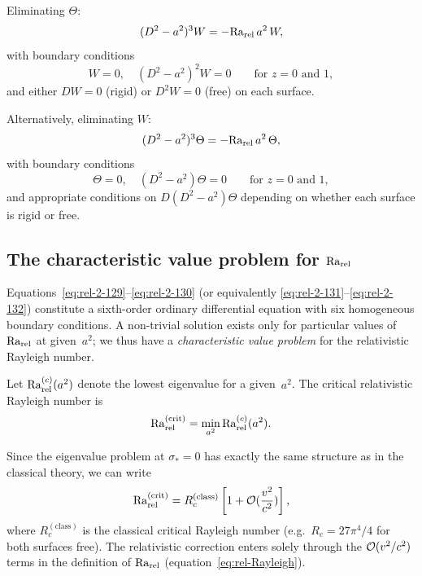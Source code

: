Eliminating $\Theta$:
\begin{equation}
\label{eq:rel-2-129}
(D^2 - a^2)^3 W = -\mathrm{Ra}_{\mathrm{rel}}\, a^2\, W,
\end{equation}
with boundary conditions
\begin{equation}
\label{eq:rel-2-130}
W = 0, \quad (D^2-a^2)^2 W = 0 \qquad\text{for } z = 0 \text{ and } 1,
\end{equation}
and either $DW = 0$ (rigid) or $D^2 W = 0$ (free) on each surface.

Alternatively, eliminating $W$:
\begin{equation}
\label{eq:rel-2-131}
(D^2-a^2)^3\Theta = -\mathrm{Ra}_{\mathrm{rel}}\, a^2\, \Theta,
\end{equation}
with boundary conditions
\begin{equation}
\label{eq:rel-2-132}
\Theta = 0, \quad (D^2-a^2)\Theta = 0 \qquad\text{for } z = 0 \text{ and } 1,
\end{equation}
and appropriate conditions on $D(D^2-a^2)\Theta$ depending on whether
each surface is rigid or free.

\subsection{The characteristic value problem for $\mathrm{Ra}_{\mathrm{rel}}$}
\label{sec:rel-12b}

Equations~\eqref{eq:rel-2-129}--\eqref{eq:rel-2-130} (or equivalently
\eqref{eq:rel-2-131}--\eqref{eq:rel-2-132}) constitute a sixth-order
ordinary differential equation with six homogeneous boundary conditions.
A non-trivial solution exists only for particular values of $\mathrm{Ra}_{\mathrm{rel}}$ at
given~$a^2$; we thus have a \emph{characteristic value problem} for the
relativistic Rayleigh number.

Let $\mathrm{Ra}_{\mathrm{rel}}^{(c)}(a^2)$ denote the lowest eigenvalue for a given~$a^2$.
The critical relativistic Rayleigh number is
\begin{equation}
\label{eq:rel-Rac}
\mathrm{Ra}_{\mathrm{rel}}^{(\mathrm{crit})}
= \min_{a^2} \mathrm{Ra}_{\mathrm{rel}}^{(c)}(a^2).
\end{equation}

Since the eigenvalue problem at $\sigma_* = 0$ has exactly the same
structure as in the classical theory, we can write
\begin{equation}
\label{eq:rel-Rac-expansion}
\mathrm{Ra}_{\mathrm{rel}}^{(\mathrm{crit})}
= R_c^{(\mathrm{class})}
  \left[1 + \mathcal{O}(\frac{v^2}{c^2})\right],
\end{equation}
where $R_c^{(\mathrm{class})}$ is the classical critical Rayleigh number
(e.g.\ $R_c = 27\pi^4/4$ for both surfaces free).  The relativistic
correction enters solely through the $\mathcal{O}(v^2/c^2)$ terms in the
definition of $\mathrm{Ra}_{\mathrm{rel}}$ (equation~\eqref{eq:rel-Rayleigh}).

